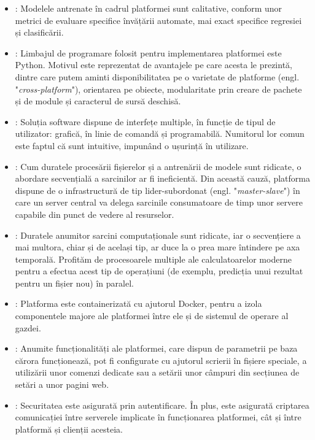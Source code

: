 \documentclass[../../main.tex]{subfiles}
\begin{document}
\begin{itemize}
    \item {}: Modelele antrenate în cadrul platformei sunt calitative, conform unor metrici de evaluare specifice învățării automate, mai exact specifice regresiei și clasificării.
    \item {}: Limbajul de programare folosit pentru implementarea platformei este Python. Motivul este reprezentat de avantajele pe care acesta le prezintă, dintre care putem aminti disponibilitatea pe o varietate de platforme (engl. "\textit{cross-platform}"), orientarea pe obiecte, modularitate prin creare de pachete și de module și caracterul de sursă deschisă.
    \item {}: Soluția software dispune de interfețe multiple, în funcție de tipul de utilizator: grafică, în linie de comandă și programabilă. Numitorul lor comun este faptul că sunt intuitive, impunând o ușurință în utilizare.
    \item {}: Cum duratele procesării fișiere\-lor și a antrenării de modele sunt ridicate, o abordare secvențială a sarcini\-lor ar fi ineficientă. Din această cauză, platforma dispune de o infrastructură de tip lider-subordonat (engl. "\textit{master-slave}") în care un server central va delega sarcinile consumatoare de timp unor servere capabile din punct de vedere al resurselor.
    \item {}: Duratele anumitor sarcini computaționale sunt ridicate, iar o secvențiere a mai multora, chiar și de același tip, ar duce la o prea mare întindere pe axa temporală. Profităm de procesoarele multiple ale calculatoarelor moderne pentru a efectua acest tip de operațiuni (de e\-xemplu, predicția unui rezultat pentru un fișier nou) în paralel.
    \item {}: Platforma este containerizată cu ajutorul Docker, pentru a izola componentele majore ale platformei între ele și de sistemul de operare al gazdei.
    \item {}: Anumite funcționalități ale platformei, care dispun de parametrii pe baza cărora funcționează, pot fi configurate cu ajutorul scrierii în fișiere speciale, a utilizării unor comenzi dedicate sau a setării unor câmpuri din secțiunea de setări a unor pagini web.
    \item {}: Securitatea este asigurată prin autentificare. În plus, este asigurată criptarea comunicației între serverele implicate în funcționarea platformei, cât și între platformă și clienții acesteia.

\end{itemize}
\end{document}
